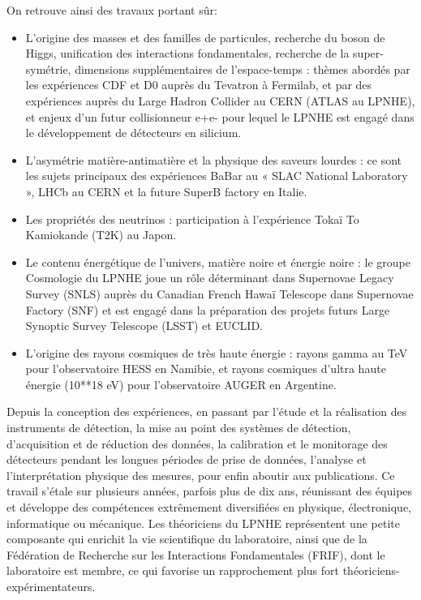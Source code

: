 \documentclass[french,a4paper,12pt]{report}
\begin{document}
  On retrouve ainsi des travaux portant sûr:  
  \begin{itemize}
  \item L'origine des masses et des familles de particules, recherche du boson de Higgs, unification des interactions fondamentales, recherche de la super-symétrie, dimensions supplémentaires de l’espace-temps : thèmes abordés par les expériences CDF et D0 auprès du Tevatron à Fermilab, et par des expériences auprès du Large Hadron Collider au CERN (ATLAS au LPNHE), et enjeux d’un futur collisionneur e+e- pour lequel le LPNHE est engagé dans le développement de détecteurs en silicium.
  
  \item L’asymétrie matière-antimatière et la physique des saveurs lourdes : ce sont les sujets principaux des expériences BaBar au « SLAC National Laboratory », LHCb au CERN et la future SuperB factory en Italie.
  
  \item Les propriétés des neutrinos : participation à l’expérience Tokaï To Kamiokande (T2K) au Japon.
  
  \item Le contenu énergétique de l’univers, matière noire et énergie noire : le groupe Cosmologie du LPNHE joue un rôle déterminant dans Supernovae Legacy Survey (SNLS) auprès du Canadian French Hawaï Telescope dans Supernovae Factory (SNF) et est engagé dans la préparation des projets futurs Large Synoptic Survey Telescope (LSST) et EUCLID.
  
  \item L'origine des rayons cosmiques de très haute énergie : rayons gamma au TeV pour l’observatoire HESS en Namibie, et rayons cosmiques d’ultra haute énergie (10**18 eV) pour l’observatoire AUGER en Argentine.
  \end{itemize}
  
  Depuis la conception des expériences, en passant par l’étude et la réalisation des instruments de détection, la mise au point des systèmes de détection, d’acquisition et de réduction des données, la calibration et le monitorage des détecteurs pendant les longues périodes de prise de données, l’analyse et l’interprétation physique des mesures, pour enfin aboutir aux publications.
  Ce travail s'étale sur plusieurs années, parfois plus de dix ans, réunissant des équipes et développe des compétences extrêmement diversifiées en physique, électronique, informatique ou mécanique. 
  Les théoriciens du LPNHE représentent une petite composante qui enrichit la vie scientifique du laboratoire, ainsi que de la Fédération de Recherche sur les Interactions Fondamentales (FRIF), dont le laboratoire est membre, ce qui favorise un rapprochement plus fort théoriciens-expérimentateurs.
  
\end{document}
